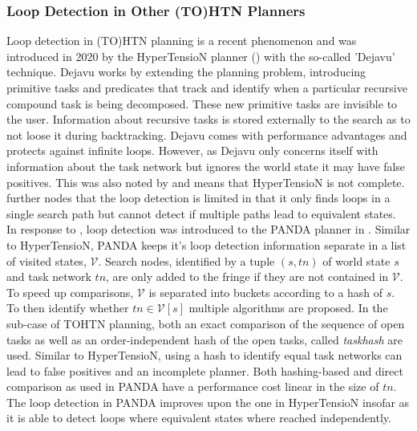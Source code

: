 \subsubsection{Loop Detection in Other (TO)HTN Planners}
\label{ld - history others}
Loop detection in (TO)HTN planning is a recent phenomenon and was introduced in 2020 by the HyperTensioN planner (\cite{magnaguagno2020hypertension}) with the so-called 'Dejavu' technique. Dejavu works by extending the planning problem, introducing primitive tasks and predicates that track and identify when a particular recursive compound task is being decomposed. These new primitive tasks are invisible to the user. Information about recursive tasks is stored externally to the search as to not loose it during backtracking. Dejavu comes with performance advantages and protects against infinite loops. However, as Dejavu only concerns itself with information about the task network but ignores the world state it may have false positives. This was also noted by \cite{holler2021loop} and means that HyperTensioN is not complete. \cite{holler2021loop} further nodes that the loop detection is limited in that it only finds loops in a single search path but cannot detect if multiple paths lead to equivalent states. \\
In response to \cite{magnaguagno2020hypertension}, loop detection was introduced to the PANDA planner in \cite{holler2021loop}. Similar to HyperTensioN, PANDA keeps it's loop detection information separate in a list of visited states, $\mathcal{V}$. Search nodes, identified by a tuple $(s, tn)$ of world state $s$ and task network $tn$, are only added to the fringe if they are not contained in $\mathcal{V}$. To speed up comparisons, $\mathcal{V}$ is separated into buckets according to a hash of $s$. To then identify whether $tn \in \mathcal{V}[s]$ multiple algorithms are proposed. In the sub-case of TOHTN planning, both an exact comparison of the sequence of open tasks as well as an order-independent hash of the open tasks, called \textit{taskhash} are used. Similar to HyperTensioN, using a hash to identify equal task networks can lead to false positives and an incomplete planner. Both hashing-based and direct comparison as used in PANDA have a performance cost linear in the size of $tn$. The loop detection in PANDA improves upon the one in HyperTensioN insofar as it is able to detect loops where equivalent states where reached independently.
